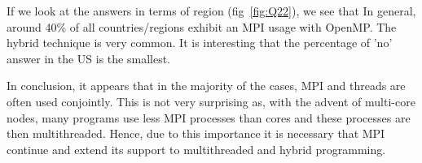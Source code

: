 If we look at the answers in terms of region (fig~\ref{fig:Q22}), we see that In
general, around 40\% of all countries/regions exhibit an MPI usage with OpenMP. The
hybrid technique is very common.  It is interesting that the percentage of 'no'
answer in the US is the smallest.

In conclusion, it appears that in the majority of the cases, MPI and threads are
often used conjointly.  This is not very surprising as, with the advent of
multi-core nodes, many programs use less MPI processes than cores and these
processes are then multithreaded. Hence, due to this importance it is necessary
that MPI continue and extend its support to multithreaded and hybrid programming.